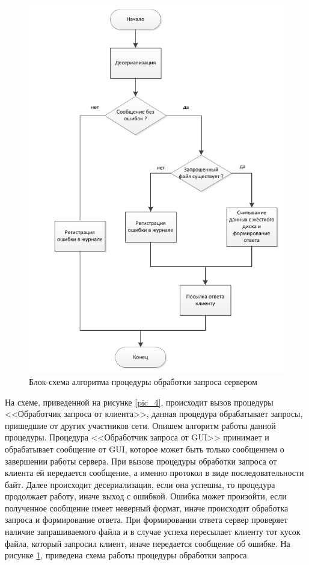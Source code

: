 \begin{figure}[!p]
    \centering
    \includegraphics[width=\textwidth]{pic_5}
    \caption{Блок-схема алгоритма процедуры обработки запроса сервером}\label{pic_5}
\end{figure}

\newpar
На схеме, приведенной на рисунке \ref{pic_4}, происходит вызов процедуры <<Обработчик
запроса от клиента>>, данная процедура обрабатывает запросы, пришедшие от
других участников сети. Опишем алгоритм работы данной процедуры.
\newpar
Процедура <<Обработчик запроса от GUI>> принимает и обрабатывает
сообщение от GUI, которое может быть только сообщением о завершении
работы сервера.
\newpar
При вызове процедуры обработки запроса от клиента ей передается
сообщение, а именно протокол в виде последовательности байт. Далее
происходит десериализация, если она успешна, то процедура продолжает
работу, иначе выход с ошибкой. Ошибка может произойти, если полученное
сообщение имеет неверный формат, иначе происходит обработка запроса и
формирование ответа. При формировании ответа сервер проверяет наличие
запрашиваемого файла и в случае успеха пересылает клиенту тот кусок
файла, который запросил клиент, иначе передается сообщение об ошибке.
\newpar
На рисунке \ref{pic_5}, приведена схема работы процедуры обработки запроса.

